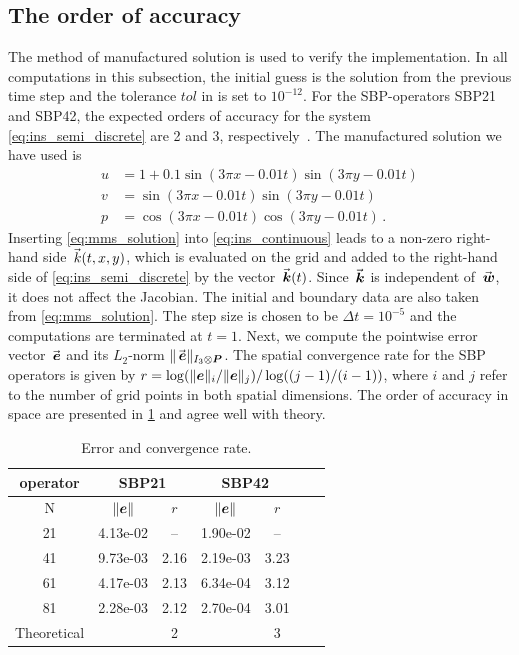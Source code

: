 \subsection{The order of accuracy}
The method of manufactured solution \cite{roache2002code} is used to verify the implementation. In all computations in this subsection, the initial guess is the solution from the previous time step and the tolerance $tol$ in  is set to $10^{-12}$.
For the SBP-operators SBP21 and SBP42, the expected orders of accuracy for the system \eqref{eq:ins_semi_discrete} are 2 and 3, respectively~\cite{svard2006order,svard2019convergence}. The manufactured solution we have used is
\begin{equation}
  \begin{aligned}
    u & = 1 + 0.1 \sin(3\pi x-0.01t)\sin(3\pi y-0.01t)
    \\
    v & = \sin(3\pi x-0.01t)\sin(3\pi y-0.01t)
    \\
    p & = \cos(3\pi x-0.01t)\cos(3\pi y-0.01t)
    \, .
 \end{aligned}
 \label{eq:mms_solution}
\end{equation}
Inserting \eqref{eq:mms_solution} into \eqref{eq:ins_continuous} leads to a non-zero right-hand side $\vecs{k}(t,x,y)$, which is evaluated on the grid and added to the right-hand side of \eqref{eq:ins_semi_discrete} by the vector $\vecs{\kn}(t)$. Since $\vecs{\kn}$ is independent of $\wn$, it does not affect the Jacobian. The initial and boundary data are also taken from \eqref{eq:mms_solution}.
The step size is chosen to be $\Delta t = 10^{-5}$ and the computations are terminated at $t = 1$. Next, we compute the pointwise error vector $\vecs{\en}$ and its $L_2$-norm $\|\vecs{\en}\|_{I_3\otimes \Pn}$. The spatial convergence rate for the SBP operators is given by $r = \log(\|\bm{e}\|_{i}/\|\bm{e}\|_{j})/\log((j-1)/(i-1))$, where $i$ and $j$ refer to the number of grid points in both spatial dimensions. The order of accuracy in space are presented in \cref{tab:convergence_table} and agree well with theory.
\begin{table}
\centering
\setlength{\tabcolsep}{12pt}
\begin{tabular}{c| cc | cc cc}
 \hline
 \hline
 operator
 & \multicolumn{2}{c|}{SBP21}
 & \multicolumn{2}{c}{SBP42}
 \\
\hline
 \hline
N & $\|\bm{e}\|$ & $r$ &$\|\bm{e}\|$ & $r$
\\
\hline
21 & 4.13e-02 & --   & 1.90e-02 & -- 
\\   
41 & 9.73e-03 & 2.16 & 2.19e-03 & 3.23
\\
61 & 4.17e-03 & 2.13 & 6.34e-04 & 3.12  
\\
81 & 2.28e-03 & 2.12 & 2.70e-04 & 3.01
\\
\hline
Theoretical && 2 && 3
\end{tabular}
\caption{Error and convergence rate.}%
\label{tab:convergence_table}
\end{table}

